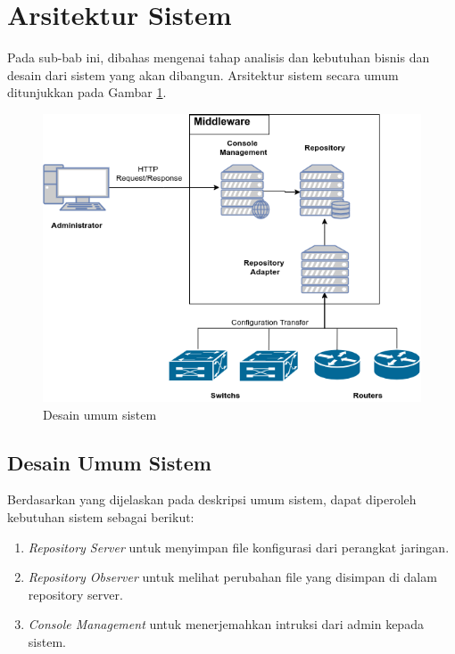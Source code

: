 	\section{Arsitektur Sistem}
		Pada sub-bab ini, dibahas mengenai tahap analisis dan kebutuhan bisnis dan desain dari sistem yang akan dibangun. Arsitektur sistem secara umum ditunjukkan pada Gambar \ref{DesainUmumSistem}.\\
		\begin{figure}[H]
			\centering
			\includegraphics[width=\textwidth]{Images/C-3/Desain-Umum-TA-4.png}
			\caption{Desain umum sistem}
			\label{DesainUmumSistem}
		\end{figure}

		\subsection{Desain Umum Sistem}
			Berdasarkan yang dijelaskan pada deskripsi umum sistem, dapat diperoleh kebutuhan sistem sebagai berikut:
			\begin{enumerate}
				\item \textit{Repository Server} untuk menyimpan file konfigurasi dari perangkat jaringan.
				\item \textit{Repository Observer} untuk melihat perubahan file yang disimpan di dalam repository server.
				\item \textit{Console Management} untuk menerjemahkan intruksi dari admin kepada sistem.
			\end{enumerate}
                
                
